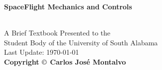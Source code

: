 \documentclass{article}
\begin{document}
\begin{center}
\begin{LARGE}{\bf SpaceFlight Mechanics and Controls}\end{LARGE}\\
\large
\vspace{22 mm}
   A Brief Textbook Presented to the \\ 
   Student Body of the University of South Alabama \\
\vspace{22 mm}
\vspace{22 mm}
\vspace{22 mm}
       Last Update: \today\\
{\bf Copyright $\copyright$ Carlos Jos\'{e} Montalvo}
\end{center}



\linespread{1}

\newpage


\end{document}
